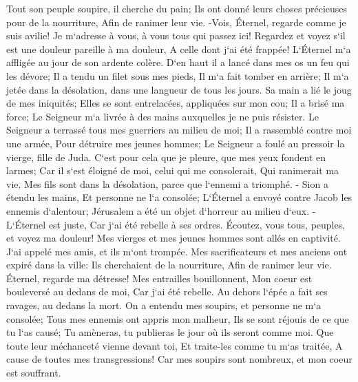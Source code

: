 \verse Tout son peuple soupire, il cherche du pain; Ils ont donné leurs choses précieuses pour de la nourriture, Afin de ranimer leur vie. -Vois, Éternel, regarde comme je suis avilie! 
\verse Je m`adresse à vous, à vous tous qui passez ici! Regardez et voyez s`il est une douleur pareille à ma douleur, A celle dont j`ai été frappée! L`Éternel m`a affligée au jour de son ardente colère. 
\verse D`en haut il a lancé dans mes os un feu qui les dévore; Il a tendu un filet sous mes pieds, Il m`a fait tomber en arrière; Il m`a jetée dans la désolation, dans une langueur de tous les jours. 
\verse Sa main a lié le joug de mes iniquités; Elles se sont entrelacées, appliquées sur mon cou; Il a brisé ma force; Le Seigneur m`a livrée à des mains auxquelles je ne puis résister. 
\verse Le Seigneur a terrassé tous mes guerriers au milieu de moi; Il a rassemblé contre moi une armée, Pour détruire mes jeunes hommes; Le Seigneur a foulé au pressoir la vierge, fille de Juda. 
\verse C`est pour cela que je pleure, que mes yeux fondent en larmes; Car il s`est éloigné de moi, celui qui me consolerait, Qui ranimerait ma vie. Mes fils sont dans la désolation, parce que l`ennemi a triomphé. - 
\verse Sion a étendu les mains, Et personne ne l`a consolée; L`Éternel a envoyé contre Jacob les ennemis d`alentour; Jérusalem a été un objet d`horreur au milieu d`eux. - 
\verse L`Éternel est juste, Car j`ai été rebelle à ses ordres. Écoutez, vous tous, peuples, et voyez ma douleur! Mes vierges et mes jeunes hommes sont allés en captivité. 
\verse J`ai appelé mes amis, et ils m`ont trompée. Mes sacrificateurs et mes anciens ont expiré dans la ville: Ils cherchaient de la nourriture, Afin de ranimer leur vie. 
\verse Éternel, regarde ma détresse! Mes entrailles bouillonnent, Mon coeur est bouleversé au dedans de moi, Car j`ai été rebelle. Au dehors l`épée a fait ses ravages, au dedans la mort. 
\verse On a entendu mes soupirs, et personne ne m`a consolée; Tous mes ennemis ont appris mon malheur, Ils se sont réjouis de ce que tu l`as causé; Tu amèneras, tu publieras le jour où ils seront comme moi. 
\verse Que toute leur méchanceté vienne devant toi, Et traite-les comme tu m`as traitée, A cause de toutes mes transgressions! Car mes soupirs sont nombreux, et mon coeur est souffrant. 

